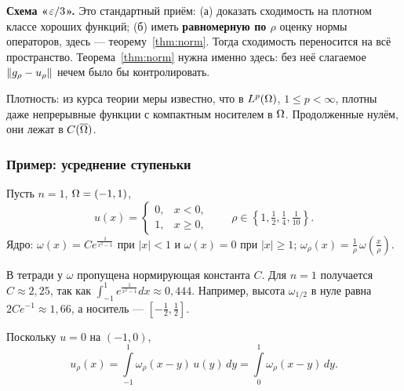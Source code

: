 \begin{idea}
\textbf{Схема «$\varepsilon/3$».} Это стандартный приём: (а) доказать сходимость на плотном классе
хороших функций; (б) иметь \textbf{равномерную по $\rho$} оценку нормы операторов, здесь —
теорему~\ref{thm:norm}. Тогда сходимость переносится на всё пространство. Теорема~\ref{thm:norm}
нужна именно здесь: без неё слагаемое $\left\lVert g_\rho - u_\rho \right\rVert$ нечем было бы контролировать.

\medskip
Плотность: из курса теории меры известно, что в $L^{p}(\Omega)$, $1 \le p < \infty$, плотны
даже непрерывные функции с компактным носителем в $\Omega$. Продолженные нулём, они лежат
в $C(\overline{\Omega})$.
\end{idea}

\subsubsection*{Пример: усреднение ступеньки}

\begin{example}
Пусть $n = 1$, $\Omega = (-1, 1)$,
\[
  u(x) = \begin{cases} 0, & x < 0, \\ 1, & x \ge 0, \end{cases}
  \qquad \rho \in \left\{1, \tfrac12, \tfrac14, \tfrac1{10}\right\}.
\]
Ядро: $\omega(x) = C e^{\frac{1}{x^2-1}}$ при $|x| < 1$ и $\omega(x) = 0$ при $|x| \ge 1$;
$\omega_\rho(x) = \frac1\rho\,\omega\!\left(\frac x\rho\right)$.
\end{example}

\begin{warn}
В тетради у $\omega$ пропущена нормирующая константа $C$. Для $n = 1$ получается
$C \approx 2{,}25$, так как $\int_{-1}^1 e^{\frac{1}{x^2-1}}dx \approx 0{,}444$. Например,
высота $\omega_{1/2}$ в нуле равна $2Ce^{-1} \approx 1{,}66$, а носитель — $[-\tfrac12, \tfrac12]$.
\end{warn}


Поскольку $u = 0$ на $(-1,0)$,
\[
  u_\rho(x) = \int\limits_{-1}^{1} \omega_\rho(x - y)\,u(y)\,dy = \int\limits_0^1 \omega_\rho(x - y)\,dy .
\]

